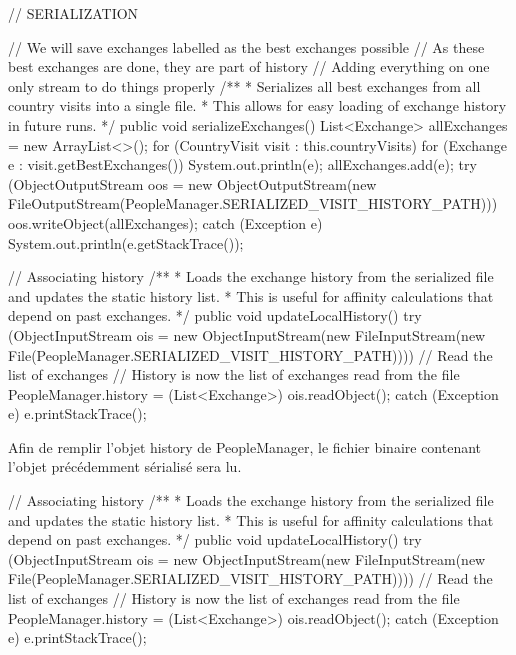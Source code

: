 \documentclass{mytex}
\begin{document}
\begin{codebox}
// SERIALIZATION 

// We will save exchanges labelled as the best exchanges possible
// As these best exchanges are done, they are part of history
// Adding everything on one only stream to do things properly
/**
* Serializes all best exchanges from all country visits into a single file.
* This allows for easy loading of exchange history in future runs.
*/
public void serializeExchanges() {
	List<Exchange> allExchanges = new ArrayList<>();
	for (CountryVisit visit : this.countryVisits) {
		for (Exchange e : visit.getBestExchanges()) {
			System.out.println(e);
			allExchanges.add(e);
		}
	}
	try (ObjectOutputStream oos = new ObjectOutputStream(new FileOutputStream(PeopleManager.SERIALIZED_VISIT_HISTORY_PATH))) {
		oos.writeObject(allExchanges);
	} catch (Exception e) {
		System.out.println(e.getStackTrace());
	}
}

// Associating history  
/**
* Loads the exchange history from the serialized file and updates the static history list.
* This is useful for affinity calculations that depend on past exchanges.
*/
public void updateLocalHistory() {
	try (ObjectInputStream ois = new ObjectInputStream(new FileInputStream(new File(PeopleManager.SERIALIZED_VISIT_HISTORY_PATH)))) {
		// Read the list of exchanges
		// History is now the list of exchanges read from the file
		PeopleManager.history = (List<Exchange>) ois.readObject();
	} catch (Exception e) {
		e.printStackTrace();
	}
}
\end{codebox}


Afin de remplir l'objet history de PeopleManager, le fichier binaire contenant l'objet précédemment sérialisé sera lu.

\begin{codebox}
// Associating history  
/**
* Loads the exchange history from the serialized file and updates the static history list.
* This is useful for affinity calculations that depend on past exchanges.
*/
public void updateLocalHistory() {
	try (ObjectInputStream ois = new ObjectInputStream(new FileInputStream(new File(PeopleManager.SERIALIZED_VISIT_HISTORY_PATH)))) {
		// Read the list of exchanges
		// History is now the list of exchanges read from the file
		PeopleManager.history = (List<Exchange>) ois.readObject();
	} catch (Exception e) {
		e.printStackTrace();
	}
}

\end{codebox}
\end{document}

